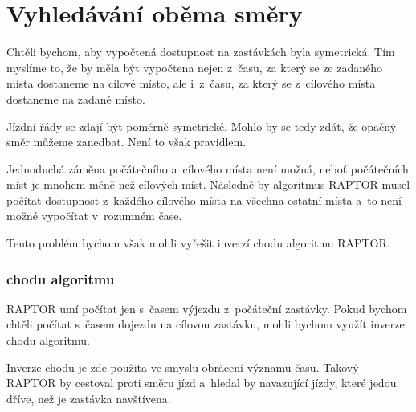 \section{Vyhledávání oběma směry}

Chtěli bychom, aby vypočtená dostupnost na zastávkách byla symetrická. Tím myslíme to, že by měla být vypočtena nejen z~času, za který se ze zadaného místa dostaneme na cílové místo, ale i~z~času, za který se z~cílového místa dostaneme na zadané místo.

Jízdní řády se zdají být poměrně symetrické. Mohlo by se tedy zdát, že opačný směr můžeme zanedbat. Není to však pravidlem.

Jednoduchá záměna počátečního a~cílového místa není možná, neboť počátečních míst je mnohem méně než cílových míst. Následně by algoritmus RAPTOR musel počítat dostupnost z~každého cílového místa na všechna ostatní místa a~to není možné vypočítat v~rozumném čase.

Tento problém bychom však mohli vyřešit inverzí chodu algoritmu RAPTOR.

\subsubsection{ chodu algoritmu}\label{raptor-inverze}

RAPTOR umí počítat jen s~časem výjezdu z~počáteční zastávky. Pokud bychom chtěli počítat s~časem dojezdu na cílovou zastávku, mohli bychom využít inverze chodu algoritmu.

Inverze chodu je zde použita ve smyslu obrácení významu času. Takový RAPTOR by cestoval proti směru jízd a~hledal by navazující jízdy, které jedou dříve, než je zastávka navštívena.

